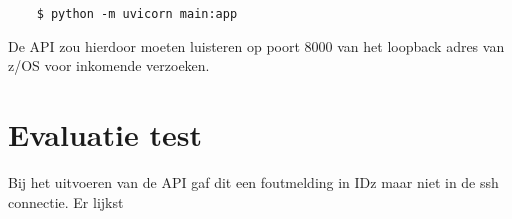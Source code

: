 \begin{lstlisting}
    $ python -m uvicorn main:app
\end{lstlisting}

De API zou hierdoor moeten luisteren op poort 8000 van het loopback adres van z/OS voor inkomende verzoeken. 


\chapter{Evaluatie test}
\label{ch:eval-test}
Bij het uitvoeren van de API gaf dit een foutmelding in IDz maar niet in de ssh connectie. Er lijkst







